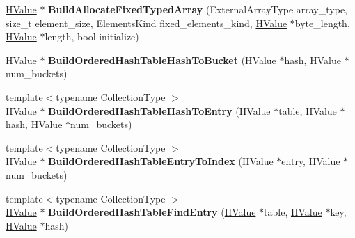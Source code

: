 \begin{DoxyCompactItemize}
\item 
\hyperlink{classv8_1_1internal_1_1_h_value}{H\+Value} $\ast$ {\bfseries Build\+Allocate\+Fixed\+Typed\+Array} (External\+Array\+Type array\+\_\+type, size\+\_\+t element\+\_\+size, Elements\+Kind fixed\+\_\+elements\+\_\+kind, \hyperlink{classv8_1_1internal_1_1_h_value}{H\+Value} $\ast$byte\+\_\+length, \hyperlink{classv8_1_1internal_1_1_h_value}{H\+Value} $\ast$length, bool initialize)\hypertarget{classv8_1_1internal_1_1_h_optimized_graph_builder_a0debab4408faf920a5cbfb11e047d535}{}\label{classv8_1_1internal_1_1_h_optimized_graph_builder_a0debab4408faf920a5cbfb11e047d535}

\item 
\hyperlink{classv8_1_1internal_1_1_h_value}{H\+Value} $\ast$ {\bfseries Build\+Ordered\+Hash\+Table\+Hash\+To\+Bucket} (\hyperlink{classv8_1_1internal_1_1_h_value}{H\+Value} $\ast$hash, \hyperlink{classv8_1_1internal_1_1_h_value}{H\+Value} $\ast$num\+\_\+buckets)\hypertarget{classv8_1_1internal_1_1_h_optimized_graph_builder_a14c5c346a21f678214cf3eaff259e236}{}\label{classv8_1_1internal_1_1_h_optimized_graph_builder_a14c5c346a21f678214cf3eaff259e236}

\item 
{\footnotesize template$<$typename Collection\+Type $>$ }\\\hyperlink{classv8_1_1internal_1_1_h_value}{H\+Value} $\ast$ {\bfseries Build\+Ordered\+Hash\+Table\+Hash\+To\+Entry} (\hyperlink{classv8_1_1internal_1_1_h_value}{H\+Value} $\ast$table, \hyperlink{classv8_1_1internal_1_1_h_value}{H\+Value} $\ast$hash, \hyperlink{classv8_1_1internal_1_1_h_value}{H\+Value} $\ast$num\+\_\+buckets)\hypertarget{classv8_1_1internal_1_1_h_optimized_graph_builder_afbb1b037cefffee3e9062d82d457bd14}{}\label{classv8_1_1internal_1_1_h_optimized_graph_builder_afbb1b037cefffee3e9062d82d457bd14}

\item 
{\footnotesize template$<$typename Collection\+Type $>$ }\\\hyperlink{classv8_1_1internal_1_1_h_value}{H\+Value} $\ast$ {\bfseries Build\+Ordered\+Hash\+Table\+Entry\+To\+Index} (\hyperlink{classv8_1_1internal_1_1_h_value}{H\+Value} $\ast$entry, \hyperlink{classv8_1_1internal_1_1_h_value}{H\+Value} $\ast$num\+\_\+buckets)\hypertarget{classv8_1_1internal_1_1_h_optimized_graph_builder_a6669b72ecce5fa49f609e9d6006f00c8}{}\label{classv8_1_1internal_1_1_h_optimized_graph_builder_a6669b72ecce5fa49f609e9d6006f00c8}

\item 
{\footnotesize template$<$typename Collection\+Type $>$ }\\\hyperlink{classv8_1_1internal_1_1_h_value}{H\+Value} $\ast$ {\bfseries Build\+Ordered\+Hash\+Table\+Find\+Entry} (\hyperlink{classv8_1_1internal_1_1_h_value}{H\+Value} $\ast$table, \hyperlink{classv8_1_1internal_1_1_h_value}{H\+Value} $\ast$key, \hyperlink{classv8_1_1internal_1_1_h_value}{H\+Value} $\ast$hash)\hypertarget{classv8_1_1internal_1_1_h_optimized_graph_builder_a95de06c39173633b8ff31b3cd9764e65}{}\label{classv8_1_1internal_1_1_h_optimized_graph_builder_a95de06c39173633b8ff31b3cd9764e65}


\end{DoxyCompactItemize}
